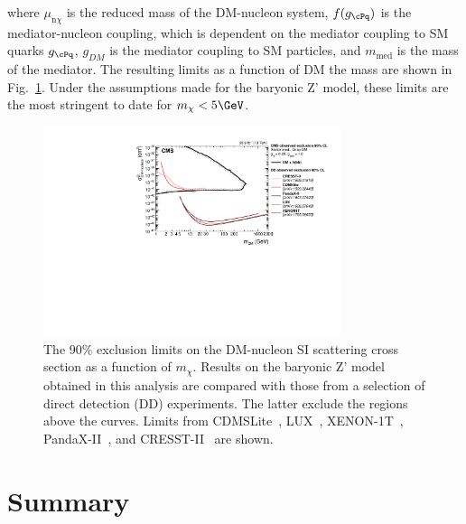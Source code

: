 where $\mu_{\mathrm{n}\chi}$ is the reduced mass of the DM-nucleon system, $f(g_{\cPq})$ is the mediator-nucleon coupling, which is dependent on the mediator coupling to SM quarks $g_{\cPq}$, $g_{DM}$ is the mediator coupling to SM particles, and $m_{\text{med}}$ is the mass of the mediator.
The resulting \SigSI limits as a function of DM the mass are shown in Fig.~\ref{fig:limitsdd}.
Under the assumptions made for the baryonic Z' model, these limits are the most stringent to date for $m_\chi < 5\GeV$.


\begin{figure}
  \centering
  \includegraphics[width=0.775\textwidth]{figures/limits/SpinIndepend_XsecDM_MonoHbb_bb_obs_Summary.pdf}
  \caption{The 90\% \CL exclusion limits on the DM-nucleon SI scattering cross section as a function of $m_{\chi}$. 
Results on the baryonic Z' model obtained in this analysis are compared with those from a selection of direct detection (DD) experiments. 
The latter exclude the regions above the curves. 
Limits from CDMSLite~\cite{CDMSLite}, LUX~\cite{LUX}, XENON-1T~\cite{XENON1T}, PandaX-II~\cite{PandaxII}, and CRESST-II~\cite{CresstII} are shown.}
  \label{fig:limitsdd}
\end{figure}


\section{Summary}

